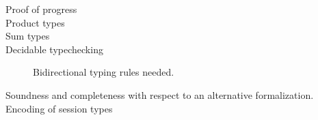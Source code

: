 \documentclass[a4paper,UKenglish,cleveref,autoref,thm-restate,authorcolumns]{lipics-v2019}
\theoremstyle{definition}
\begin{document}
\begin{description}

\item [Proof of progress]

\item [Product types]

\item [Sum types]

\item [Decidable typechecking]

  Bidirectional typing rules needed.

\item [Soundness and completeness with respect to an alternative formalization.]

\item [Encoding of session types]

\end{description}

\newpage


\newpage
\appendix

\end{document}
